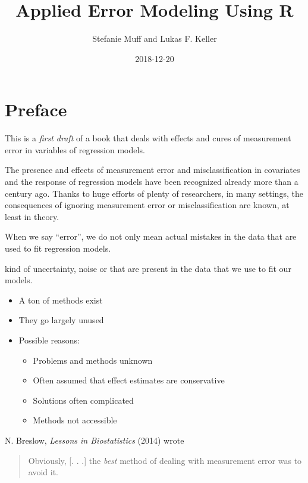 \documentclass[]{book}
\title{Applied Error Modeling Using R}
\author{Stefanie Muff and Lukas F. Keller}
\date{2018-12-20}
\providecommand{\tightlist}{%
  \setlength{\itemsep}{0pt}\setlength{\parskip}{0pt}}
\theoremstyle{definition}
\theoremstyle{definition}
\theoremstyle{definition}
\theoremstyle{remark}
\begin{document}
\maketitle

{
\setcounter{tocdepth}{1}
\tableofcontents
}
\chapter*{Preface}\label{preface}

This is a \emph{first draft} of a book that deals with effects and cures
of measurement error in variables of regression models.

The presence and effects of measurement error and misclassification in
covariates and the response of regression models have been recognized
already more than a century ago. Thanks to huge efforts of plenty of
researchers, in many settings, the consequences of ignoring measurement
error or misclassification are known, at least in theory.

When we say ``error'', we do not only mean actual mistakes in the data
that are used to fit regression models.

kind of uncertainty, noise or that are present in the data that we use
to fit our models.

\begin{itemize}
\tightlist
\item
  A ton of methods exist
\item
  They go largely unused
\item
  Possible reasons:

  \begin{itemize}
  \tightlist
  \item
    Problems and methods unknown\\
  \item
    Often assumed that effect estimates are conservative
  \item
    Solutions often complicated
  \item
    Methods not accessible
  \end{itemize}
\end{itemize}

N. Breslow, \emph{Lessons in Biostatistics} (2014) \citep{breslow2014}
wrote

\begin{quote}
Obviously, {[}. . .{]} the \emph{best} method of dealing with
measurement error was to avoid it.
\end{quote}
\end{document}
